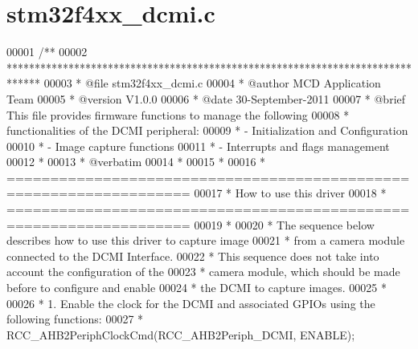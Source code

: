 \section{stm32f4xx\+\_\+dcmi.\+c}
\label{stm32f4xx__dcmi_8c_source}

\begin{DoxyCode}
00001 \textcolor{comment}{/**}
00002 \textcolor{comment}{  ******************************************************************************}
00003 \textcolor{comment}{  * @file    stm32f4xx\_dcmi.c}
00004 \textcolor{comment}{  * @author  MCD Application Team}
00005 \textcolor{comment}{  * @version V1.0.0}
00006 \textcolor{comment}{  * @date    30-September-2011}
00007 \textcolor{comment}{  * @brief   This file provides firmware functions to manage the following }
00008 \textcolor{comment}{  *          functionalities of the DCMI peripheral:           }
00009 \textcolor{comment}{  *           - Initialization and Configuration}
00010 \textcolor{comment}{  *           - Image capture functions  }
00011 \textcolor{comment}{  *           - Interrupts and flags management}
00012 \textcolor{comment}{  *}
00013 \textcolor{comment}{  *  @verbatim  }
00014 \textcolor{comment}{  *  }
00015 \textcolor{comment}{  *        }
00016 \textcolor{comment}{  *          ===================================================================}
00017 \textcolor{comment}{  *                                 How to use this driver}
00018 \textcolor{comment}{  *          ===================================================================  }
00019 \textcolor{comment}{  *         }
00020 \textcolor{comment}{  *         The sequence below describes how to use this driver to capture image}
00021 \textcolor{comment}{  *         from a camera module connected to the DCMI Interface.}
00022 \textcolor{comment}{  *         This sequence does not take into account the configuration of the  }
00023 \textcolor{comment}{  *         camera module, which should be made before to configure and enable}
00024 \textcolor{comment}{  *         the DCMI to capture images.}
00025 \textcolor{comment}{  *           }
00026 \textcolor{comment}{  *          1. Enable the clock for the DCMI and associated GPIOs using the following functions:}
00027 \textcolor{comment}{  *                 RCC\_AHB2PeriphClockCmd(RCC\_AHB2Periph\_DCMI, ENABLE);}

\end{DoxyCode}
